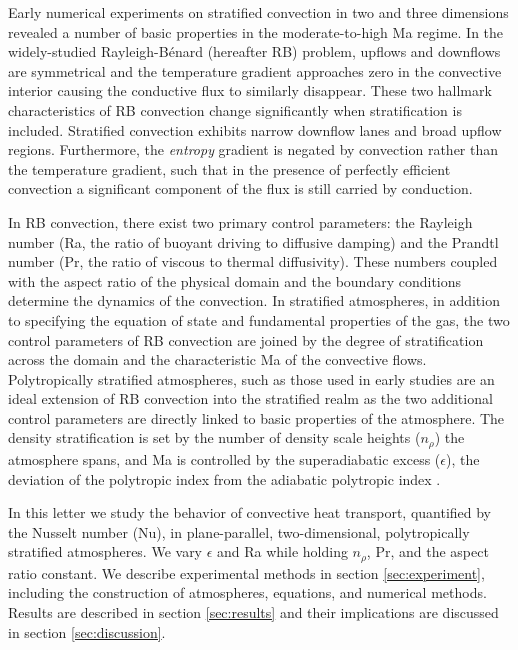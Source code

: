 \documentclass[aps, prl, twocolumn, nofootinbib, groupedaddress, amsfonts, amssymb, amsmath]{revtex4-1}
\newcommand{\RB}{Rayleigh-B\'{e}nard }
\newcommand{\nrho}{\ensuremath{n_{\rho}}}
\begin{document}
Early numerical experiments on stratified convection
in two \cite{graham1975, chan&all1982,
hurlburt&all1984, cattaneo&all1990} and three 
\cite{cattaneo&all1991, brummell&all1996} dimensions
revealed a number of basic properties in the moderate-to-high 
Ma regime. In the widely-studied \RB (hereafter RB) problem, 
upflows and downflows are symmetrical and
the temperature gradient approaches zero in the convective interior 
causing the conductive flux to similarly 
disappear.  These two hallmark characteristics of RB convection change
significantly when stratification is included.  Stratified convection 
exhibits narrow downflow lanes and broad upflow regions.
Furthermore, the \emph{entropy} gradient is negated by convection 
rather than the temperature gradient, such
that in the presence of perfectly efficient convection a significant 
component of the flux is still carried by conduction.

In RB convection, there exist two primary control parameters: 
the Rayleigh number (Ra, the ratio of
buoyant driving to diffusive damping) and the Prandtl number 
(Pr, the ratio of viscous to thermal
diffusivity).  These numbers coupled with the aspect ratio of 
the physical domain and the boundary conditions
determine the dynamics of the convection.  In stratified atmospheres, 
in addition to specifying the equation of state and
fundamental properties of the gas, the two control parameters of 
RB convection are joined by the degree of
stratification across the domain and the characteristic 
Ma of the convective flows.  
Polytropically stratified atmospheres, such as those used in 
early studies \cite{graham1975, chan&all1982, hurlburt&all1984, 
cattaneo&all1990, cattaneo&all1991, brummell&all1996} are an ideal extension of
RB convection into the stratified realm as the two additional 
control parameters are directly linked to
basic properties of the atmosphere.  The density stratification is 
set by the number of density scale heights (\nrho)
the atmosphere spans, and Ma is controlled 
by the superadiabatic excess ($\epsilon$),
the deviation of the polytropic index from the adiabatic polytropic 
index \cite{graham1975}.

In this letter we study the behavior of convective heat transport, 
quantified by the Nusselt number (Nu), in plane-parallel, 
two-dimensional, polytropically stratified atmospheres.  
We vary $\epsilon$ and Ra while holding $\nrho$, Pr, and the aspect ratio
constant.  We describe experimental methods in section 
\ref{sec:experiment}, including the construction of atmospheres, equations, and numerical methods.  
Results are described in section \ref{sec:results} and their implications are discussed
in section \ref{sec:discussion}.
\end{document}
